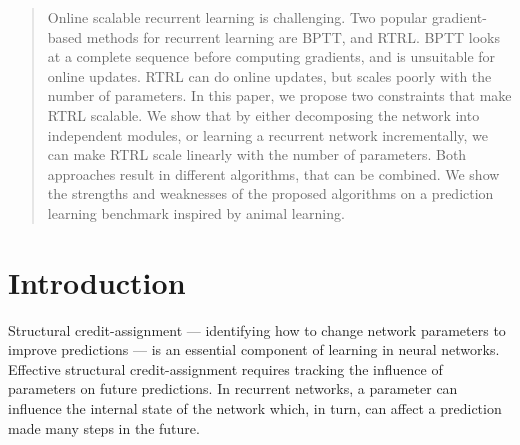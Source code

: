 \documentclass{article}
\newcommand{\algoname}{\text{Master-User}}
\newcommand{\archi}{\text{Col-NN}}
\begin{document}
\begin{abstract}

Online scalable recurrent learning is challenging. Two popular gradient-based methods for recurrent learning are BPTT, and RTRL. BPTT looks at a complete sequence before computing gradients, and is unsuitable for online updates. RTRL can do online updates, but scales poorly with the number of parameters. In this paper, we propose two constraints that make RTRL scalable. We show that by either decomposing the network into independent modules, or learning a recurrent network incrementally, we can make RTRL scale linearly with the number of parameters. Both approaches result in different algorithms, that can be combined. We show the strengths and weaknesses of the proposed algorithms on a prediction learning benchmark inspired by animal learning. 
\end{abstract}

\section{Introduction}
Structural credit-assignment --- identifying how to change network parameters to improve predictions --- is an essential component of learning in neural networks. Effective structural credit-assignment requires tracking the influence of parameters on future predictions. In recurrent networks, a parameter can influence the internal state of the network which, in turn, can affect a prediction made many steps in the future.
\end{document}
